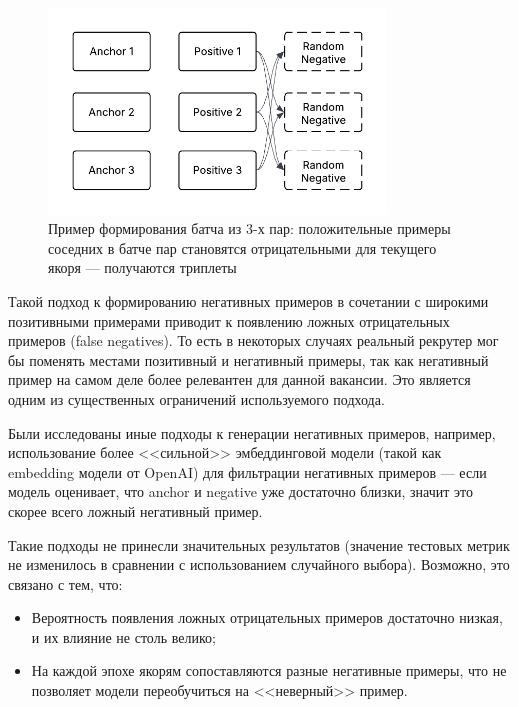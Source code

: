 \documentclass[14pt]{mmcs_article}
\begin{document}
\begin{figure}[h]
  \centering
  \includegraphics[width=0.8\textwidth]{plots/batch_triplets.pdf}
  \caption{\centering Пример формирования батча из 3-х пар: положительные примеры соседних в батче пар становятся отрицательными для текущего якоря --- получаются триплеты}
  \label{fig:batch_triplets}
\end{figure}

Такой подход к формированию негативных примеров в сочетании с широкими позитивными примерами приводит к появлению ложных отрицательных примеров (false negatives). То есть в некоторых случаях реальный рекрутер мог бы поменять местами позитивный и негативный примеры, так как негативный пример на самом деле более релевантен для данной вакансии. Это является одним из существенных ограничений используемого подхода.

Были исследованы иные подходы к генерации негативных примеров, например, использование более <<сильной>> эмбеддинговой модели (такой как embedding модели от OpenAI) для фильтрации негативных примеров --- если модель оценивает, что anchor и negative уже достаточно близки, значит это скорее всего ложный негативный пример.

Такие подходы не принесли значительных результатов (значение тестовых метрик не изменилось в сравнении с использованием случайного выбора). Возможно, это связано с тем, что:

\begin{itemize}
  \item Вероятность появления ложных отрицательных примеров достаточно низкая, и их влияние не столь велико;
  \item На каждой эпохе якорям сопоставляются разные негативные примеры, что не позволяет модели переобучиться на <<неверный>> пример.
\end{itemize}

\newpage
\end{document}
